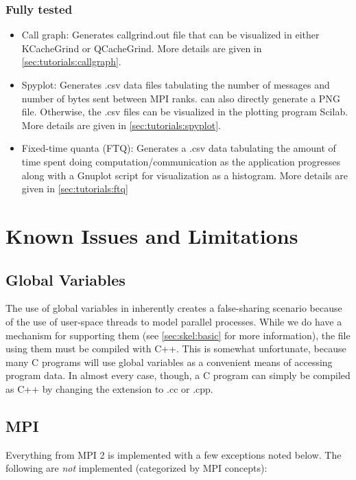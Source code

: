 \subsubsection{Fully tested}
\label{subsubsec:intro:fulltestedtools}
\begin{itemize}
\item Call graph: Generates callgrind.out file that can be visualized in either KCacheGrind or QCacheGrind. More details are given in \ref{sec:tutorials:callgraph}.
\item Spyplot: Generates .csv data files tabulating the number of messages and number of bytes sent between MPI ranks. \sstmacro can also directly generate a PNG file. Otherwise, the .csv files can be visualized in the plotting program Scilab. More details are given in \ref{sec:tutorials:spyplot}.
\item Fixed-time quanta (FTQ): Generates a .csv data tabulating the amount of time spent doing computation/communication as the application progresses along with a Gnuplot script for visualization as a histogram. More details are given in \ref{sec:tutorials:ftq}
\end{itemize}

\section{Known Issues and Limitations}
\label{sec:intro:issues}

\subsection{Global Variables}
\label{subsec:issues:globals}

The use of global variables in \sstmacro inherently creates a false-sharing scenario 
because of the use of user-space threads to model parallel processes.   
While we do have a mechanism for supporting them (see \ref{sec:skel:basic} for more information), 
the file using them must be compiled with C++.   
This is somewhat unfortunate, because many C programs will use global variables as a convenient means of accessing program data.   
In almost every case, though, a C program can simply be compiled as C++ by changing the extension to .cc or .cpp.

\subsection{MPI}
\label{subsec:issues:mpi}

Everything from MPI 2 is implemented with a few exceptions noted below.  
The following are \textit{not} implemented (categorized by MPI concepts):

